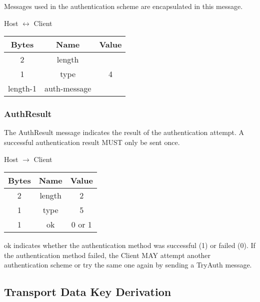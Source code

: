 Messages used in the authentication scheme are encapsulated in this message.

\begin{center}
    Host $\leftrightarrow$ Client\\
    \begin{tabular}{|c|c|c|}
        \hline
        \textbf{Bytes} & \textbf{Name} & \textbf{Value} \\
        \hline
        2              & length        &                \\
        \hline
        1              & type          & 4              \\
        \hline
        length-1       & auth-message  &                \\
        \hline
    \end{tabular}
\end{center}

\subsubsection{AuthResult}

The AuthResult message indicates the result of the authentication attempt.
A successful authentication result MUST only be sent once.

\begin{center}
    Host $\rightarrow$ Client\\
    \begin{tabular}{|c|c|c|}
        \hline
        \textbf{Bytes} & \textbf{Name} & \textbf{Value} \\
        \hline
        2              & length        & 2              \\
        \hline
        1              & type          & 5              \\
        \hline
        1              & ok            & 0 or 1         \\
        \hline
    \end{tabular}
\end{center}

ok indicates whether the authentication method was successful (1) or failed (0).
If the authentication method failed, the Client MAY attempt another authentication scheme or try the same one again by sending a TryAuth message.

\subsection{Transport Data Key Derivation}

